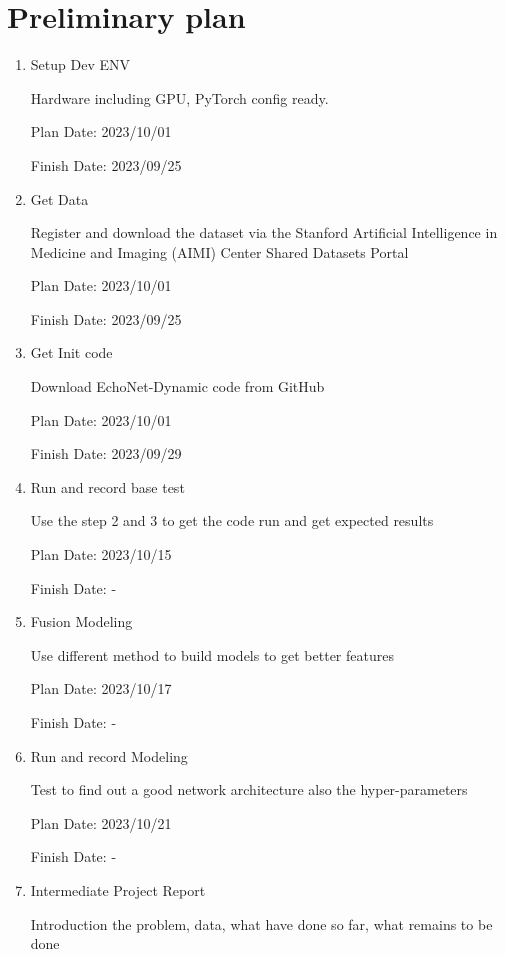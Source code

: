 \section{Preliminary plan}
\label{sec:formatting}


\begin{enumerate}
  \item Setup Dev ENV
  
    Hardware including GPU, PyTorch config ready.
  
    Plan Date: 2023/10/01 
    
    Finish Date: 2023/09/25
  \item Get Data
  
  Register and download the dataset via the Stanford Artificial Intelligence in Medicine and Imaging (AIMI) Center Shared Datasets Portal
  
  Plan Date: 2023/10/01 
    
  Finish Date: 2023/09/25
  
  \item Get Init code
  
  Download EchoNet-Dynamic code from GitHub
  
  Plan Date: 2023/10/01 
    
  Finish Date: 2023/09/29
  
  \item Run and record base test
  
  Use the step 2 and 3 to get the code run and get expected results
  
  Plan Date: 2023/10/15 
    
  Finish Date: -
  
  \item Fusion Modeling
  
  Use different method to build models to get better features
  
  Plan Date: 2023/10/17 
    
  Finish Date: - 
  
  \item Run and record Modeling
  
  Test to find out a good network architecture also the hyper-parameters
  
  Plan Date: 2023/10/21 
    
  Finish Date: -
  
  \item Intermediate Project Report
  
  Introduction the problem, data, what have done so far, what remains to be done
  

\end{enumerate}
